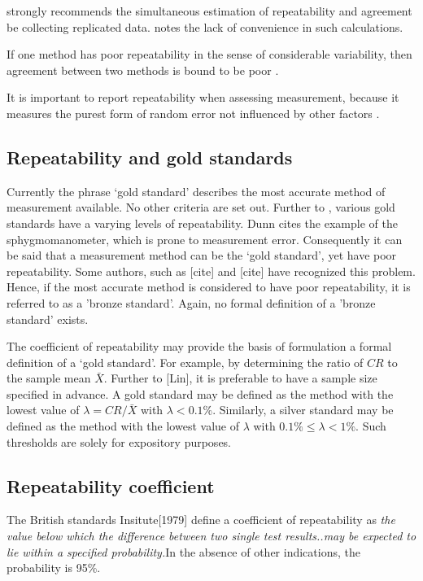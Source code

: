 \documentclass[12pt, a4paper]{article}
\begin{document}
\citet{BA99} strongly recommends the simultaneous estimation of repeatability and agreement be collecting replicated data. \citet{ARoy2009} notes the lack of convenience in such calculations.


If one method has poor repeatability in the sense of considerable variability, then agreement between two methods is bound to be poor \citep{ARoy2009}.

It is important to report repeatability when assessing measurement, because it measures the purest form of random error not influenced by other factors \citep{Barnhart}.

\subsection{Repeatability and gold standards}
Currently the phrase `gold standard' describes the most accurate method of measurement available. No other criteria are set out. Further to \citet{dunnSEME}, various gold standards have a varying levels of repeatability. Dunn cites the example of the sphygmomanometer, which is prone to measurement error. Consequently it can be said that a measurement method can be the `gold standard', yet have poor repeatability. Some authors, such as [cite] and [cite] have recognized this problem. Hence, if the most accurate method is considered to have poor repeatability, it is referred to as a 'bronze standard'.  Again, no formal definition of a 'bronze standard' exists.

The coefficient of repeatability may provide the basis of formulation a formal definition of a `gold standard'. For example, by determining the ratio of $CR$ to the sample mean $\bar{X}$. Further to [Lin], it is preferable to have a sample size specified in advance. A gold standard may be defined as the method with the lowest value of $\lambda = CR /\bar{X}$ with $\lambda < 0.1\%$. Similarly, a silver standard may be defined as the method with the lowest value of $\lambda $ with $0.1\% \leq \lambda < 1\%$. Such thresholds are solely for expository purposes.


\subsection{Repeatability coefficient}
	
	The British standards Insitute[1979] define a coefficient of repeatability  as \emph{the value below which the difference
		between two single test results..may be expected to lie within a specified probability.}In the absence of
	other indications, the probability is 95\%.
	
\end{document}
